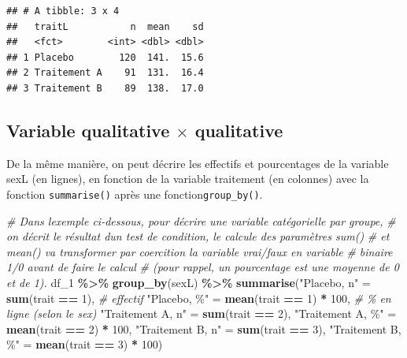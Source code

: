 \documentclass[
]{book}
\newenvironment{Shaded}{\begin{snugshade}}{\end{snugshade}}
\newcommand{\CommentTok}[1]{\textcolor[rgb]{0.56,0.35,0.01}{\textit{#1}}}
\newcommand{\DecValTok}[1]{\textcolor[rgb]{0.00,0.00,0.81}{#1}}
\newcommand{\FunctionTok}[1]{\textcolor[rgb]{0.13,0.29,0.53}{\textbf{#1}}}
\newcommand{\NormalTok}[1]{#1}
\newcommand{\OtherTok}[1]{\textcolor[rgb]{0.56,0.35,0.01}{#1}}
\newcommand{\SpecialCharTok}[1]{\textcolor[rgb]{0.81,0.36,0.00}{\textbf{#1}}}
\newcommand{\StringTok}[1]{\textcolor[rgb]{0.31,0.60,0.02}{#1}}
\begin{document}
\begin{verbatim}
## # A tibble: 3 x 4
##   traitL           n  mean    sd
##   <fct>        <int> <dbl> <dbl>
## 1 Placebo        120  141.  15.6
## 2 Traitement A    91  131.  16.4
## 3 Traitement B    89  138.  17.0
\end{verbatim}

\subsection{\texorpdfstring{Variable qualitative \(\times\) qualitative}{Variable qualitative \textbackslash times qualitative}}\label{variable-qualitative-times-qualitative-1}

De la même manière, on peut décrire les effectifs et pourcentages de la variable sexL (en lignes), en fonction de la variable traitement (en colonnes) avec la fonction \texttt{summarise()} après une fonction\texttt{group\_by()}.

\begin{Shaded}
\begin{Highlighting}[]
\CommentTok{\# Dans l\textquotesingle{}exemple ci{-}dessous, pour décrire une variable catégorielle par groupe, }
\CommentTok{\# on décrit le résultat d\textquotesingle{}un test de condition, le calcule des paramètres sum() }
\CommentTok{\# et mean() va transformer par coercition la variable vrai/faux en variable }
\CommentTok{\# binaire 1/0 avant de faire le calcul }
\CommentTok{\# (pour rappel, un pourcentage est une moyenne de 0 et de 1).}
\NormalTok{df\_1 }\SpecialCharTok{\%\textgreater{}\%}
  \FunctionTok{group\_by}\NormalTok{(sexL) }\SpecialCharTok{\%\textgreater{}\%}
  \FunctionTok{summarise}\NormalTok{(}\StringTok{"Placebo, n"} \OtherTok{=} \FunctionTok{sum}\NormalTok{(trait }\SpecialCharTok{==} \DecValTok{1}\NormalTok{), }\CommentTok{\# effectif}
            \StringTok{"Placebo, \%"} \OtherTok{=} \FunctionTok{mean}\NormalTok{(trait }\SpecialCharTok{==} \DecValTok{1}\NormalTok{) }\SpecialCharTok{*} \DecValTok{100}\NormalTok{, }\CommentTok{\# \% en ligne (selon le sex)}
            \StringTok{"Traitement A, n"} \OtherTok{=} \FunctionTok{sum}\NormalTok{(trait }\SpecialCharTok{==} \DecValTok{2}\NormalTok{), }
            \StringTok{"Traitement A, \%"} \OtherTok{=} \FunctionTok{mean}\NormalTok{(trait }\SpecialCharTok{==} \DecValTok{2}\NormalTok{) }\SpecialCharTok{*} \DecValTok{100}\NormalTok{,}
            \StringTok{"Traitement B, n"} \OtherTok{=} \FunctionTok{sum}\NormalTok{(trait }\SpecialCharTok{==} \DecValTok{3}\NormalTok{), }
            \StringTok{"Traitement B, \%"} \OtherTok{=} \FunctionTok{mean}\NormalTok{(trait }\SpecialCharTok{==} \DecValTok{3}\NormalTok{) }\SpecialCharTok{*} \DecValTok{100}\NormalTok{)}
\end{Highlighting}
\end{Shaded}
\end{document}

